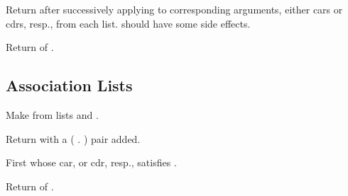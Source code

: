 \begin{LIST}{1cm}
  Return  after successively applying
   to corresponding arguments, either cars or cdrs,
  resp., from each list.  should have some side
  effects. 

  Return  of .

\end{LIST}


\subsection{Association Lists} 
\label{section:Association Lists}
\begin{LIST}{1cm}

  Make  from lists  and .
  
  Return  with a ( . ) pair added.

  First  whose car, or cdr, resp., satisfies .

  Return  of .

\end{LIST}


